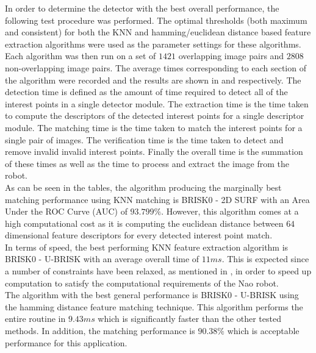 \documentclass{article}
\begin{document}
In order to determine the detector with the best overall performance, the following test procedure was performed. The optimal thresholds (both maximum and consistent) for both the KNN and hamming/euclidean distance based feature extraction algorithms were used as the parameter settings for these algorithms. Each algorithm was then run on a set of $1421$ overlapping image pairs and $2808$ non-overlapping image pairs. The average times corresponding to each section of the algorithm were recorded and the results are shown in  and  respectively. The detection time is defined as the amount of time required to detect all of the interest points in a single detector module. The extraction time is the time taken to compute the descriptors of the detected interest points for a single descriptor module. The matching time is the time taken to match the interest points for a single pair of images. The verification time is the time taken to detect and remove invalid invalid interest points. Finally the overall time is the summation of these times as well as the time to process and extract the image from the robot. \\

As can be seen in the tables, the algorithm producing the marginally best matching performance using KNN matching is BRISK0 - 2D SURF with an Area Under the ROC Curve (AUC) of $93.799\%$. However, this algorithm comes at a high computational cost as it is computing the euclidean distance between $64$ dimensional feature descriptors for every detected interest point match.\\

In terms of speed, the best performing KNN feature extraction algorithm is BRISK0 - U-BRISK with an average overall time of $11 ms$. This is expected since a number of constraints have been relaxed, as mentioned in , in order to speed up computation to satisfy the computational requirements of the Nao robot.\\

The algorithm with the best general performance is BRISK0 - U-BRISK using the hamming distance feature matching technique. This algorithm performs the entire routine in $9.43 ms$ which is significantly faster than the other tested methods. In addition, the matching performance is $90.38\%$ which is acceptable performance for this application.\\
\end{document}
